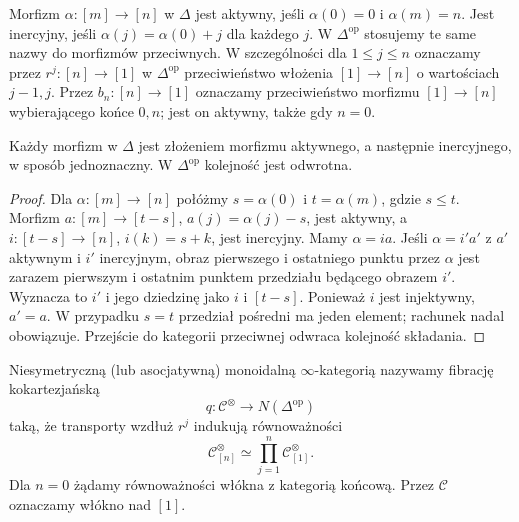\begin{definicja}\label{cat:def:infty-delta-active-inert}
Morfizm $\alpha:[m]\to[n]$ w $\Delta$ jest aktywny, jeśli $\alpha(0)=0$ i $\alpha(m)=n$. Jest inercyjny, jeśli $\alpha(j)=\alpha(0)+j$ dla każdego $j$. W $\Delta^{\mathrm{op}}$ stosujemy te same nazwy do morfizmów przeciwnych. W szczególności dla $1\leq j\leq n$ oznaczamy przez $r^j:[n]\to[1]$ w $\Delta^{\mathrm{op}}$ przeciwieństwo włożenia $[1]\to[n]$ o wartościach $j-1,j$. Przez $b_n:[n]\to[1]$ oznaczamy przeciwieństwo morfizmu $[1]\to[n]$ wybierającego końce $0,n$; jest on aktywny, także gdy $n=0$.
\end{definicja}

\begin{stwierdzenie}\label{cat:prop:infty-delta-active-inert}
Każdy morfizm w $\Delta$ jest złożeniem morfizmu aktywnego, a następnie inercyjnego, w sposób jednoznaczny. W $\Delta^{\mathrm{op}}$ kolejność jest odwrotna.
\end{stwierdzenie}
\begin{proof}
Dla $\alpha:[m]\to[n]$ połóżmy $s=\alpha(0)$ i $t=\alpha(m)$, gdzie $s\leq t$. Morfizm $a:[m]\to[t-s]$, $a(j)=\alpha(j)-s$, jest aktywny, a $i:[t-s]\to[n]$, $i(k)=s+k$, jest inercyjny. Mamy $\alpha=ia$. Jeśli $\alpha=i'a'$ z $a'$ aktywnym i $i'$ inercyjnym, obraz pierwszego i ostatniego punktu przez $\alpha$ jest zarazem pierwszym i ostatnim punktem przedziału będącego obrazem $i'$. Wyznacza to $i'$ i jego dziedzinę jako $i$ i $[t-s]$. Ponieważ $i$ jest injektywny, $a'=a$. W przypadku $s=t$ przedział pośredni ma jeden element; rachunek nadal obowiązuje. Przejście do kategorii przeciwnej odwraca kolejność składania.
\end{proof}

\begin{definicja}\label{cat:def:infty-nonsymmetric-monoidal}
Niesymetryczną (lub asocjatywną) monoidalną $\infty$-kategorią nazywamy fibrację kokartezjańską
\[
 q:\mathcal C^\otimes\longrightarrow N(\Delta^{\mathrm{op}})
\]
taką, że transporty wzdłuż $r^j$ indukują równoważności
\begin{equation}\label{cat:eq:infty-nonsymmetric-segal}
 \mathcal C^\otimes_{[n]}\simeq
 \prod_{j=1}^n\mathcal C^\otimes_{[1]}.
\end{equation}
Dla $n=0$ żądamy równoważności włókna z kategorią końcową. Przez $\mathcal C$ oznaczamy włókno nad $[1]$.
\end{definicja}

